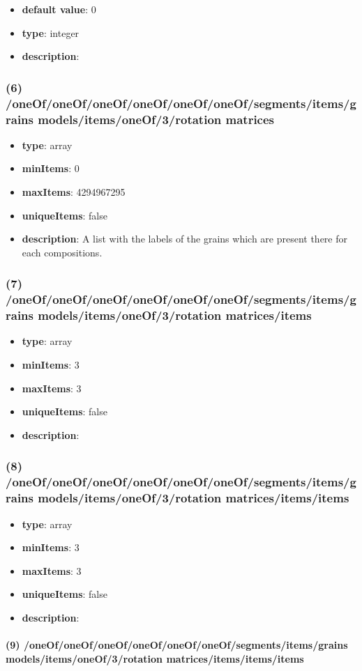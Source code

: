 \begin{itemize}[leftmargin=7em]\item {\bf default value}: 0
\item {\bf type}: integer
\item {\bf description}: 
\end{itemize}\subsubsection{(6) /oneOf/oneOf/oneOf/oneOf/oneOf/oneOf/segments/items/grains models/items/oneOf/3/rotation matrices}
\begin{itemize}[leftmargin=6em]\item {\bf type}: array
\item {\bf minItems}: 0
\item {\bf maxItems}: 4294967295
\item {\bf uniqueItems}: false
\item {\bf description}: A list with the labels of the grains which are present there for each compositions.
\end{itemize}\subsubsection{(7) /oneOf/oneOf/oneOf/oneOf/oneOf/oneOf/segments/items/grains models/items/oneOf/3/rotation matrices/items}
\begin{itemize}[leftmargin=7em]\item {\bf type}: array
\item {\bf minItems}: 3
\item {\bf maxItems}: 3
\item {\bf uniqueItems}: false
\item {\bf description}: 
\end{itemize}\subsubsection{(8) /oneOf/oneOf/oneOf/oneOf/oneOf/oneOf/segments/items/grains models/items/oneOf/3/rotation matrices/items/items}
\begin{itemize}[leftmargin=8em]\item {\bf type}: array
\item {\bf minItems}: 3
\item {\bf maxItems}: 3
\item {\bf uniqueItems}: false
\item {\bf description}: 
\end{itemize}\paragraph{(9) /oneOf/oneOf/oneOf/oneOf/oneOf/oneOf/segments/items/grains models/items/oneOf/3/rotation matrices/items/items/items}
